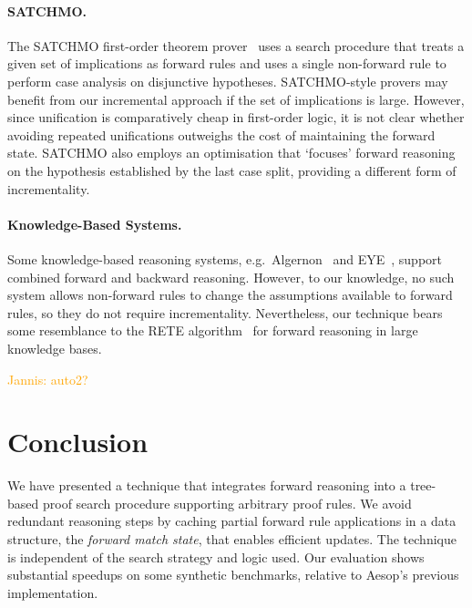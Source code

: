 \documentclass[runningheads]{llncs}
\newcommand{\jcom}[1]{{\textcolor{orange}{Jannis: #1}} }
\begin{document}
\paragraph{SATCHMO.}
The SATCHMO first-order theorem prover~\cite{SATCHMO} uses a search procedure that treats a given set of implications as forward rules and uses a single non-forward rule to perform case analysis on disjunctive hypotheses.
SATCHMO-style provers may benefit from our incremental approach if the set of implications is large.
However, since unification is comparatively cheap in first-order logic, it is not clear whether avoiding repeated unifications outweighs the cost of maintaining the forward state.
SATCHMO also employs an optimisation that \enquote*{focuses} forward reasoning on the hypothesis established by the last case split, providing a different form of incrementality.

\paragraph{Knowledge-Based Systems.}
Some knowledge-based reasoning systems, e.g.\ Algernon~\cite{Algernon} and EYE~\cite{EYE}, support combined forward and backward reasoning.
However, to our knowledge, no such system allows non-forward rules to change the assumptions available to forward rules, so they do not require incrementality.
Nevertheless, our technique bears some resemblance to the RETE algorithm~\cite{RETE} for forward reasoning in large knowledge bases.

\jcom{auto2?}

\section{Conclusion}

We have presented a technique that integrates forward reasoning into a tree-based proof search procedure supporting arbitrary proof rules.
We avoid redundant reasoning steps by caching partial forward rule applications in a data structure, the \emph{forward match state}, that enables efficient updates.
The technique is independent of the search strategy and logic used.
Our evaluation shows substantial speedups on some synthetic benchmarks, relative to Aesop's previous implementation.


\end{document}
